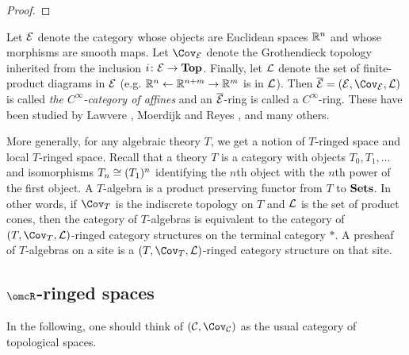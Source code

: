 \documentclass[10pt]{amsart}
\begin{document}
\begin{proof}

\end{proof}

\begin{example}

Let $\mathcal{E}$ denote the category whose objects are Euclidean spaces ${\mathbb R}^n$ and whose morphisms are smooth maps.  Let $\Cov_\mcE$ denote the Grothendieck topology inherited from the inclusion $i\colon\mathcal{E}\rightarrow{\bf Top}$.  Finally, let $\mathcal{L}$ denote the set of finite-product diagrams in $\mathcal{E}$ (e.g. ${\mathbb R}^n\leftarrow{\mathbb R}^{n+m}\rightarrow{\mathbb R}^m$ is in $\mathcal{L}$).  Then $\ol{\mcE}=(\mcE,\Cov_\mcE,\mcL)$ is called {\em the $C^\infty$-category of affines} and an $\overline{\mathcal{E}}$-ring is called a $C^\infty$-ring.  These have been studied by Lawvere \cite{Law-Alg}, Moerdijk and Reyes \cite{MR}, and many others.

\end{example}

More generally, for any algebraic theory $T$, we get a notion of $T$-ringed space and local $T$-ringed space.  Recall that a theory $T$ is a category with objects $T_0,T_1,\ldots$ and isomorphisms $T_n\cong (T_1)^n$ identifying the $n$th object with the $n$th power of the first object.  A $T$-algebra is a product preserving functor from $T$ to ${\bf Sets}$.  In other words, if $\Cov_T$ is the indiscrete topology on $T$ and $\mathcal{L}$ is the set of product cones, then the category of $T$-algebras is equivalent to the category of $(T,\Cov_T,\mcL)$-ringed category structures on the terminal category $*$.  A presheaf of $T$-algebras on a site is a $(T,\Cov_T,\mcL)$-ringed category structure on that site.

\subsection{$\omcR$-ringed spaces}

In the following, one should think of $(\mcC,\Cov_\mcC)$ as the usual category of topological spaces.
\end{document}
